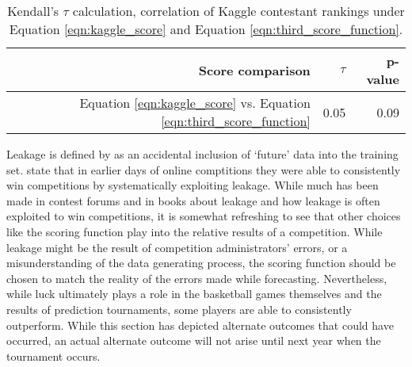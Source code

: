 \begin{table}[ht]
\centering
\begin{tabular}{rrr}
  \hline
Score comparison & $\tau$ & p-value \\ 
  \hline
Equation \ref{eqn:kaggle_score} vs. Equation \ref{eqn:third_score_function} & 0.05 & 0.09 \\ 
   \hline
\end{tabular}
\label{tab:kendall_tau_table}
\caption{Kendall's $\tau$ calculation, correlation of Kaggle contestant rankings under Equation  \ref{eqn:kaggle_score} and Equation \ref{eqn:third_score_function}.}
\end{table}



Leakage is defined by \cite{schutt2013doing} as an accidental inclusion of `future' data into the training set. \cite{schutt2013doing} state that in earlier days of online comptitions they were able to consistently win competitions by systematically exploiting leakage. While much has been made in contest forums and in books  about leakage and how leakage is often exploited to win competitions, it is somewhat refreshing to see that other choices like the scoring function play into the relative results of a competition. While leakage might be the result of competition administrators' errors, or a misunderstanding of the data generating process, the scoring function should be chosen to match the reality of the errors made while forecasting. Nevertheless, while luck ultimately plays a role in the basketball games themselves and the results of prediction tournaments, some players are able to consistently outperform. While this section has depicted alternate outcomes that could have occurred, an actual alternate outcome will not arise until next year when the tournament occurs.  